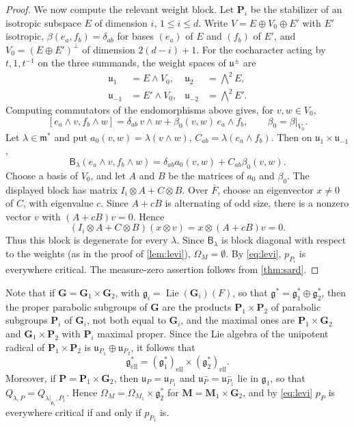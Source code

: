 \documentclass[11pt,reqno]{amsart}
\numberwithin{equation}{section}
\theoremstyle{plain}
\theoremstyle{definition}
\theoremstyle{remark}
\theoremstyle{plain}
\newcommand{\bG}{\mathbf{G}}     %
\newcommand{\bP}{\mathbf{P}}     %
\newcommand{\bM}{\mathbf{M}}     %
\newcommand{\g}{\mathfrak{g}}    %
\newcommand{\gd}{\mathfrak{g}^*} %
\newcommand{\uu}{\mathfrak{u}}   %
\newcommand{\m}{\mathfrak{m}}    %
\newcommand{\Ell}[2][]{#2_{#1\mathrm{ell}}}   %
\DeclareMathOperator{\Lie}{Lie}
\newcommand{\lf}{\lambda}
\newcommand{\Bf}{\mathsf{B}}
\begin{document}
\begin{proof}
We now compute the relevant weight block. Let $\bP_i$ be the stabilizer of an isotropic
subspace $E$ of dimension $i$, $1\le i\le d$. Write
$V=E\oplus V_0\oplus E'$ with $E'$ isotropic, $\beta(e_a,f_b)=\delta_{ab}$
for bases $(e_a)$ of $E$ and $(f_b)$ of $E'$, and
$V_0=(E\oplus E')^\perp$ of dimension $2(d-i)+1$. For the cocharacter
acting by $t,1,t^{-1}$ on the three summands, the weight spaces of
$\uu^\pm$ are
\[
\begin{aligned}
\uu_1&=E\wedge V_0, & \uu_2&=\bigwedge^2E,\\
\uu_{-1}&=E'\wedge V_0, & \uu_{-2}&=\bigwedge^2E'.
\end{aligned}
\]
Computing commutators of the endomorphisms above gives, for $v,w\in V_0$,
\[
[e_a\wedge v,f_b\wedge w]=\delta_{ab}\,v\wedge w+\beta_0(v,w)\,e_a\wedge f_b,
\qquad\beta_0=\beta|_{V_0}.
\]
Let $\lf\in\m^*$ and put $a_0(v,w)=\lf(v\wedge w)$,
$C_{ab}=\lf(e_a\wedge f_b)$. Then on $\uu_1\times\uu_{-1}$,
\[
\Bf_\lf(e_a\wedge v,f_b\wedge w)=\delta_{ab}a_0(v,w)+C_{ab}\beta_0(v,w).
\]
Choose a basis of $V_0$, and let $A$ and $B$ be the matrices of
$a_0$ and $\beta_0$. The displayed block has matrix
$I_i\otimes A+C\otimes B$. Over $\bar F$, choose an eigenvector
$x\ne0$ of $C$, with eigenvalue $c$. Since $A+cB$ is alternating
of odd size, there is a nonzero vector $v$ with $(A+cB)v=0$.
Hence
\[
(I_i\otimes A+C\otimes B)(x\otimes v)
=x\otimes(A+cB)v=0.
\]
Thus this block is degenerate for every $\lf$. Since $\Bf_\lf$ is
block diagonal with respect to the weights (as in the proof of
\cref{lem:levi}), $\Omega_M=\emptyset$.
By \eqref{eq:levi}, $p_{P_i}$ is everywhere critical.
The measure-zero assertion follows from \cref{thm:sard}.
\end{proof}

Note that if $\bG=\bG_1\times\bG_2$, with $\g_i=\Lie(\bG_i)(F)$, so that
$\gd=\g_1^*\oplus\g_2^*$, then the proper parabolic subgroups of $\bG$ are
the products $\bP_1\times\bP_2$ of parabolic subgroups $\bP_i$ of $\bG_i$, not
both equal to $\bG_i$, and the maximal ones are $\bP_1\times\bG_2$ and
$\bG_1\times\bP_2$ with $\bP_i$ maximal proper. Since the Lie algebra
of the unipotent radical of
$\bP_1\times\bP_2$ is $\uu_{P_1}\oplus\uu_{P_2}$, it follows that
\[
\Ell{\gd}=\Ell{(\g_1^*)}\times\Ell{(\g_2^*)}.
\]
Moreover, if $\bP=\bP_1\times\bG_2$, then $\uu_P=\uu_{P_1}$ and
$\uu_P^-=\uu_{P_1}^-$ lie in $\g_1$, so that $Q_{\lf,P}=Q_{\lf|_{\g_1},P_1}$.
Hence $\Omega_M=\Omega_{M_1}\times\g_2^*$ for $\bM=\bM_1\times\bG_2$, and by
\eqref{eq:levi} $p_P$ is everywhere critical if and only if $p_{P_1}$ is.
\end{document}
